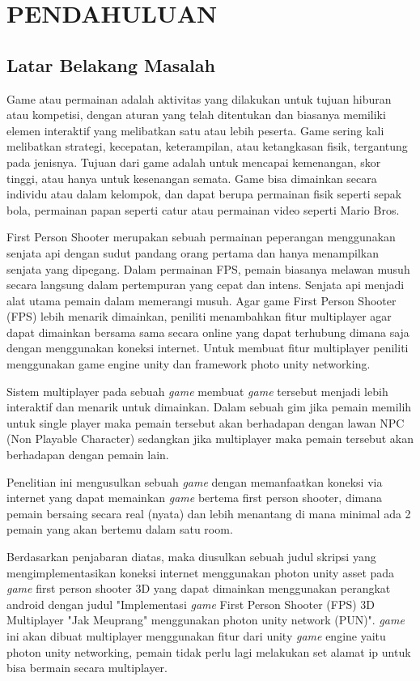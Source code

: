 \chapter{PENDAHULUAN}
\section{Latar Belakang Masalah}
 
Game atau permainan adalah aktivitas yang dilakukan untuk tujuan hiburan atau kompetisi, dengan aturan yang telah ditentukan dan biasanya memiliki elemen interaktif yang melibatkan satu atau lebih peserta. Game sering kali melibatkan strategi, kecepatan, keterampilan, atau ketangkasan fisik, tergantung pada jenisnya. Tujuan dari game adalah untuk mencapai kemenangan, skor tinggi, atau hanya untuk kesenangan semata. Game bisa dimainkan secara individu atau dalam kelompok, dan dapat berupa permainan fisik seperti sepak bola, permainan papan seperti catur atau permainan video seperti Mario Bros.

First Person Shooter merupakan sebuah permainan peperangan menggunakan senjata api dengan sudut pandang orang pertama dan hanya menampilkan senjata yang dipegang.
Dalam permainan FPS, pemain biasanya melawan musuh secara langsung dalam pertempuran yang cepat dan intens. Senjata api menjadi alat utama pemain dalam memerangi musuh.
Agar game First Person Shooter (FPS) lebih menarik dimainkan, peniliti menambahkan fitur multiplayer agar dapat dimainkan bersama sama secara online yang dapat terhubung dimana saja dengan menggunakan koneksi internet. Untuk membuat fitur multiplayer peniliti menggunakan game engine unity dan framework photo unity networking.

Sistem multiplayer pada sebuah \textit{game} membuat \textit{game} tersebut menjadi lebih interaktif dan menarik untuk dimainkan. Dalam sebuah gim jika pemain memilih untuk single player maka pemain tersebut akan berhadapan dengan lawan NPC (Non Playable Character) sedangkan jika multiplayer maka pemain tersebut akan berhadapan dengan pemain lain.


Penelitian ini mengusulkan sebuah \textit{game} dengan memanfaatkan koneksi via internet yang dapat memainkan \textit{game} bertema first person shooter, dimana pemain bersaing secara real (nyata) dan lebih menantang di mana minimal ada 2 pemain yang akan bertemu dalam satu room.

Berdasarkan penjabaran diatas, maka diusulkan sebuah judul skripsi yang mengimplementasikan koneksi internet menggunakan photon unity asset pada \textit{game} first person shooter 3D yang dapat dimainkan menggunakan perangkat android dengan judul "Implementasi \textit{game} First Person Shooter (FPS) 3D Multiplayer "Jak Meuprang" menggunakan photon unity network (PUN)".
\textit{game} ini akan dibuat multiplayer menggunakan fitur dari unity \textit{game} engine yaitu photon unity networking, pemain tidak perlu lagi melakukan set alamat ip untuk bisa bermain secara multiplayer.

